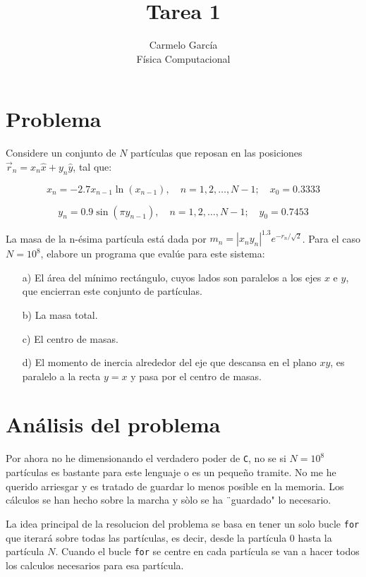 \documentclass[12pt]{article}
\begin{document}
\title{Tarea 1}
\author{Carmelo García\\ 
Física Computacional}

\maketitle

\section{Problema}

Considere un conjunto de \( N \) partículas que reposan en las posiciones \(\vec{r}_n = x_n \hat{x} + y_n \hat{y}\), tal que:

\[
x_n = -2.7 x_{n-1} \ln(x_{n-1}), \quad n = 1, 2, \ldots, N - 1; \quad x_0 = 0.3333
\]

\[
y_n = 0.9 \sin(\pi y_{n-1}), \quad n = 1, 2, \ldots, N - 1; \quad y_0 = 0.7453
\]

La masa de la n-ésima partícula está dada por \( m_n = |x_n y_n|^{1.3} e^{-r_n / \sqrt{2}} \). Para el caso \( N = 10^8 \), elabore un programa que evalúe para este sistema:

\begin{itemize}
    \item[a)] El área del mínimo rectángulo, cuyos lados son paralelos a los ejes \( x \) e \( y \), que encierran este conjunto de partículas.
    \item[b)] La masa total.
    \item[c)] El centro de masas.
    \item[d)] El momento de inercia alrededor del eje que descansa en el plano \( xy \), es paralelo a la recta \( y = x \) y pasa por el centro de masas.
\end{itemize}

\section{Análisis del problema}\label{analisis}

Por ahora no he dimensionando el verdadero poder de \verb|C|, no se si $N = 10^{8}$ partículas es bastante para este lenguaje o es un pequeño tramite.  
No me he querido arriesgar y es tratado de guardar lo menos posible en la memoria. Los cálculos se han hecho sobre la marcha y sòlo se ha ¨guardado" lo necesario. 

La idea principal de la resolucion del problema se basa en tener un solo bucle \verb|for| que iterará sobre todas las partículas, es decir, desde la partícula $0$ hasta la partícula $N$.
Cuando el bucle \verb|for| se centre en cada partícula se van a hacer todos los calculos necesarios para esa partícula. 
\end{document}

